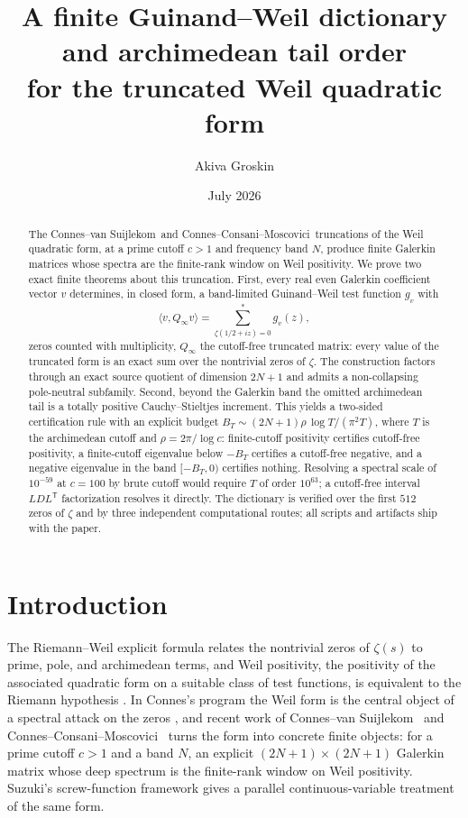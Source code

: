 \documentclass[11pt]{article}
\title{A finite Guinand--Weil dictionary and archimedean tail order\\
for the truncated Weil quadratic form}
\author{Akiva Groskin}
\date{July 2026}
\theoremstyle{plain}
\theoremstyle{definition}
\theoremstyle{remark}
\newcommand{\cvs}{Connes--van Suijlekom}
\newcommand{\ccm}{Connes--Consani--Moscovici}
\newcommand{\Qinf}{Q_{\infty}}
\begin{document}
\maketitle

\begin{abstract}
The \cvs\ and \ccm\ truncations of the Weil quadratic form, at a prime cutoff
$c>1$ and frequency band $N$, produce finite Galerkin matrices whose spectra
are the finite-rank window on Weil positivity.
We prove two exact finite theorems about this truncation.  First, every real
even Galerkin coefficient vector $v$ determines, in closed form, a band-limited
Guinand--Weil test function $g_v$ with
\[
        \langle v,\Qinf v\rangle
        =
        \sum_{\zeta(1/2+iz)=0}^{*} g_v(z),
\]
zeros counted with multiplicity, $\Qinf$ the cutoff-free truncated matrix:
every value of the truncated form is an exact sum over the nontrivial zeros
of $\zeta$.  The construction factors through an
exact source quotient of dimension $2N+1$ and admits a non-collapsing
pole-neutral subfamily.  Second, beyond the Galerkin band the omitted
archimedean tail is a totally positive Cauchy--Stieltjes increment.  This
yields a two-sided certification rule with an explicit budget
$B_T\sim(2N{+}1)\rho\,\log T/(\pi^2T)$, where $T$ is the archimedean cutoff
and $\rho=2\pi/\log c$: finite-cutoff positivity certifies
cutoff-free positivity, a finite-cutoff eigenvalue below $-B_T$ certifies a
cutoff-free negative, and a negative eigenvalue in the band $[-B_T,0)$
certifies nothing.  Resolving a spectral scale of $10^{-59}$ at $c=100$ by brute
cutoff would require $T$ of order $10^{63}$; a cutoff-free interval
$LDL^{\mathsf T}$ factorization resolves it directly.  The dictionary is
verified over the first $512$ zeros of $\zeta$ and by three independent
computational routes; all scripts and artifacts ship with the paper.
\end{abstract}

\section{Introduction}

The Riemann--Weil explicit formula relates the nontrivial zeros of $\zeta(s)$
to prime, pole, and archimedean terms, and Weil positivity, the positivity of
the associated quadratic form on a suitable class of test functions, is
equivalent to the Riemann hypothesis \cite{Weil1952,Guinand1948,Bombieri2000,
Yoshida1992}.  In Connes's program the Weil form is the central object of a
spectral attack on the zeros
\cite{Connes1999,ConnesConsani2020,ConnesConsani2021,Connes2026}, and recent
work of
\cvs\ \cite{ConnesvanSuijlekom2025} and \ccm\ \cite{ConnesConsaniMoscovici2025}
turns the form into concrete finite objects: for a prime cutoff $c>1$ and a
band $N$, an explicit $(2N{+}1)\times(2N{+}1)$ Galerkin matrix whose deep
spectrum is the finite-rank window on Weil positivity.  Suzuki's screw-function
framework \cite{Suzuki2026} gives a parallel continuous-variable treatment of
the same form.
\end{document}
